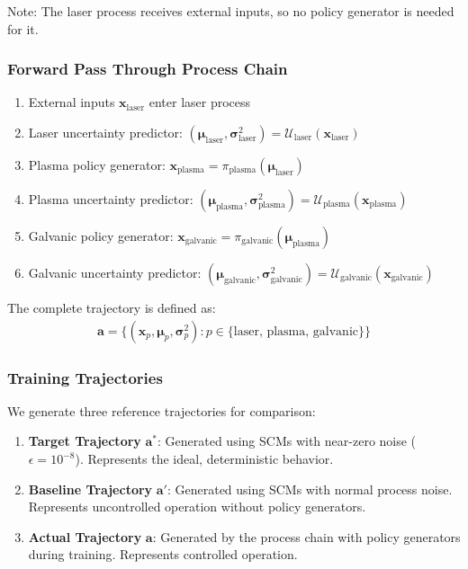 \documentclass[11pt,a4paper]{article}
\begin{document}
Note: The laser process receives external inputs, so no policy generator is needed for it.

\subsubsection{Forward Pass Through Process Chain}
\begin{enumerate}
    \item External inputs $\mathbf{x}_{\text{laser}}$ enter laser process
    \item Laser uncertainty predictor: $(\boldsymbol{\mu}_{\text{laser}}, \boldsymbol{\sigma}^2_{\text{laser}}) = \mathcal{U}_{\text{laser}}(\mathbf{x}_{\text{laser}})$
    \item Plasma policy generator: $\mathbf{x}_{\text{plasma}} = \pi_{\text{plasma}}(\boldsymbol{\mu}_{\text{laser}})$
    \item Plasma uncertainty predictor: $(\boldsymbol{\mu}_{\text{plasma}}, \boldsymbol{\sigma}^2_{\text{plasma}}) = \mathcal{U}_{\text{plasma}}(\mathbf{x}_{\text{plasma}})$
    \item Galvanic policy generator: $\mathbf{x}_{\text{galvanic}} = \pi_{\text{galvanic}}(\boldsymbol{\mu}_{\text{plasma}})$
    \item Galvanic uncertainty predictor: $(\boldsymbol{\mu}_{\text{galvanic}}, \boldsymbol{\sigma}^2_{\text{galvanic}}) = \mathcal{U}_{\text{galvanic}}(\mathbf{x}_{\text{galvanic}})$
\end{enumerate}

The complete trajectory is defined as:
\begin{align}
\mathbf{a} = \{(\mathbf{x}_p, \boldsymbol{\mu}_p, \boldsymbol{\sigma}^2_p) : p \in \{\text{laser, plasma, galvanic}\}\}
\end{align}

\subsubsection{Training Trajectories}
We generate three reference trajectories for comparison:

\begin{enumerate}
    \item \textbf{Target Trajectory} $\mathbf{a}^*$: Generated using SCMs with near-zero noise ($\epsilon = 10^{-8}$). Represents the ideal, deterministic behavior.

    \item \textbf{Baseline Trajectory} $\mathbf{a}'$: Generated using SCMs with normal process noise. Represents uncontrolled operation without policy generators.

    \item \textbf{Actual Trajectory} $\mathbf{a}$: Generated by the process chain with policy generators during training. Represents controlled operation.
\end{enumerate}
\end{document}

